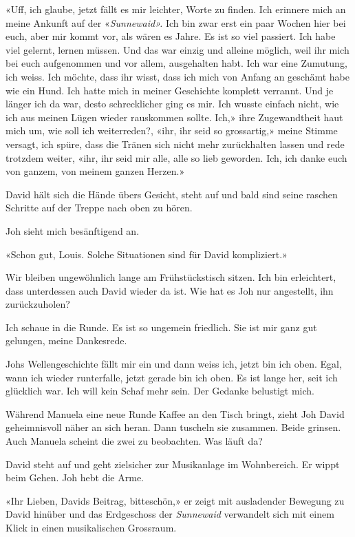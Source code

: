 «Uff, ich glaube, jetzt fällt es mir leichter, Worte zu finden. Ich
erinnere mich an meine Ankunft auf der «\emph{Sunnewaid».} Ich bin zwar
erst ein paar Wochen hier bei euch, aber mir kommt vor, als wären es
Jahre. Es ist so viel passiert. Ich habe viel gelernt, lernen müssen.
Und das war einzig und alleine möglich, weil ihr mich bei euch
aufgenommen und vor allem, ausgehalten habt. Ich war eine Zumutung, ich
weiss. Ich möchte, dass ihr wisst, dass ich mich von Anfang an geschämt
habe wie ein Hund. Ich hatte mich in meiner Geschichte komplett
verrannt. Und je länger ich da war, desto schrecklicher ging es mir. Ich
wusste einfach nicht, wie ich aus meinen Lügen wieder rauskommen sollte.
Ich,» ihre Zugewandtheit haut mich um, wie soll ich weiterreden?, «ihr,
ihr seid so grossartig,» meine Stimme versagt, ich spüre, dass die
Tränen sich nicht mehr zurückhalten lassen und rede trotzdem weiter,
«ihr, ihr seid mir alle, alle so lieb geworden. Ich, ich danke euch von
ganzem, von meinem ganzen Herzen.»

David hält sich die Hände übers Gesicht, steht auf und bald sind seine
raschen Schritte auf der Treppe nach oben zu hören.

Joh sieht mich besänftigend an.

«Schon gut, Louis. Solche Situationen sind für David kompliziert.»

Wir bleiben ungewöhnlich lange am Frühstückstisch sitzen. Ich bin
erleichtert, dass unterdessen auch David wieder da ist. Wie hat es Joh
nur angestellt, ihn zurückzuholen?

Ich schaue in die Runde. Es ist so ungemein friedlich. Sie ist mir ganz
gut gelungen, meine Dankesrede.

Johs Wellengeschichte fällt mir ein und dann weiss ich, jetzt bin ich
oben. Egal, wann ich wieder runterfalle, jetzt gerade bin ich oben. Es
ist lange her, seit ich glücklich war. Ich will kein Schaf mehr sein.
Der Gedanke belustigt mich.

Während Manuela eine neue Runde Kaffee an den Tisch bringt, zieht Joh
David geheimnisvoll näher an sich heran. Dann tuscheln sie zusammen.
Beide grinsen. Auch Manuela scheint die zwei zu beobachten. Was läuft
da?

David steht auf und geht zielsicher zur Musikanlage im Wohnbereich. Er
wippt beim Gehen. Joh hebt die Arme.

«Ihr Lieben, Davids Beitrag, bitteschön,» er zeigt mit ausladender
Bewegung zu David hinüber und das Erdgeschoss der \emph{Sunnewaid}
verwandelt sich mit einem Klick in einen musikalischen Grossraum.

